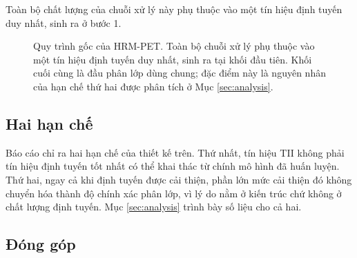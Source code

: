 \documentclass[11pt,a4paper]{article}
\begin{document}
Toàn bộ chất lượng của chuỗi xử lý này phụ thuộc vào một tín hiệu định tuyến duy
nhất, sinh ra ở bước 1.

\begin{figure}[H]
\centering
{}
\caption{Quy trình gốc của HRM-PET. Toàn bộ chuỗi xử lý phụ thuộc vào một tín
hiệu định tuyến duy nhất, sinh ra tại khối đầu tiên. Khối cuối cùng là đầu phân
lớp dùng chung; đặc điểm này là nguyên nhân của hạn chế thứ hai được phân tích ở
Mục \ref{sec:analysis}.}
\label{fig:hrmpet}
\end{figure}

\subsection{Hai hạn chế}

Báo cáo chỉ ra hai hạn chế của thiết kế trên. Thứ nhất, tín hiệu TII không phải
tín hiệu định tuyến tốt nhất có thể khai thác từ chính mô hình đã huấn luyện.
Thứ hai, ngay cả khi định tuyến được cải thiện, phần lớn mức cải thiện đó không
chuyển hóa thành độ chính xác phân lớp, vì lý do nằm ở kiến trúc chứ không ở
chất lượng định tuyến. Mục \ref{sec:analysis} trình bày số liệu cho cả hai.

\subsection{Đóng góp}
\end{document}

